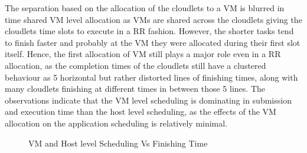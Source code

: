 \documentclass[times, 10pt,twocolumn]{article}
\begin{document}
The separation based on the allocation of the cloudlets to a VM is blurred in time shared VM level allocation as VMs are shared across the cloudlets giving the cloudlets time slots to execute in a RR fashion. However, the shorter tasks tend to finish faster and probably at the VM they were allocated during their first slot itself. Hence, the first allocation of VM still plays a major role even in a RR allocation, as the completion times of the cloudlets still have a clustered behaviour as 5 horizontal but rather distorted lines of finishing times, along with many cloudlets finishing at different times in between those 5 lines. The observations indicate that the VM level scheduling is dominating in submission and execution time than the host level scheduling, as the effects of the VM allocation on the application scheduling is relatively minimal.
\begin{figure}[ht]
 \caption{VM and Host level Scheduling Vs Finishing Time}
 \label{fig:finish}
\end{figure}
\end{document}
